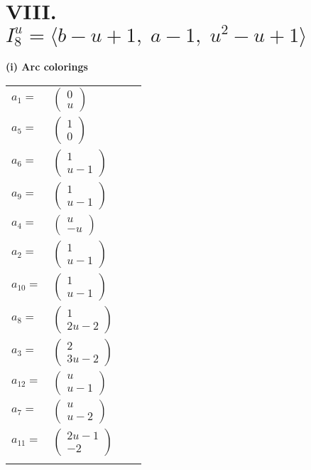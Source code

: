 \documentclass[1p]{elsarticle_modified}
\theoremstyle{definition}
\begin{document}
\centering \section*{VIII. $I^u_{8}= \langle b- u+1,\;a-1,\;u^2- u+1 \rangle$}
\flushleft \textbf{(i) Arc colorings}\\
\begin{tabular}{m{7pt} m{180pt} m{7pt} m{180pt} }
\flushright $a_{1}=$&$\begin{pmatrix}0\\u\end{pmatrix}$ \\
\flushright $a_{5}=$&$\begin{pmatrix}1\\0\end{pmatrix}$ \\
\flushright $a_{6}=$&$\begin{pmatrix}1\\u-1\end{pmatrix}$ \\
\flushright $a_{9}=$&$\begin{pmatrix}1\\u-1\end{pmatrix}$ \\
\flushright $a_{4}=$&$\begin{pmatrix}u\\- u\end{pmatrix}$ \\
\flushright $a_{2}=$&$\begin{pmatrix}1\\u-1\end{pmatrix}$ \\
\flushright $a_{10}=$&$\begin{pmatrix}1\\u-1\end{pmatrix}$ \\
\flushright $a_{8}=$&$\begin{pmatrix}1\\2 u-2\end{pmatrix}$ \\
\flushright $a_{3}=$&$\begin{pmatrix}2\\3 u-2\end{pmatrix}$ \\
\flushright $a_{12}=$&$\begin{pmatrix}u\\u-1\end{pmatrix}$ \\
\flushright $a_{7}=$&$\begin{pmatrix}u\\u-2\end{pmatrix}$ \\
\flushright $a_{11}=$&$\begin{pmatrix}2 u-1\\-2\end{pmatrix}$\\&\end{tabular}
\end{document}
